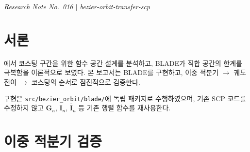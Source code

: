 \documentclass[11pt]{article}
\begin{document}
\drawborder
\thispagestyle{firstpage}


{\normalsize\textit{Research Note No.~016 $|$ bezier-orbit-transfer-scp}}\par\medskip

\def\lighterdate{March 30, 2026}


\begin{abstract}
\cite{report015}에서 이론적으로 분석한 BLADE(Bernstein Local Adaptive Degree Elements)
프레임워크를 구현하고 세 단계로 수치 검증한다.
(1)~이중 적분기에서 해석해 재현, 특수 경우 일치, 상자 제약 비교를 확인한다.
(2)~비선형 궤도 동역학과 J2 세차 시변 경계조건을 포함하는 BLADE-SCP로
공면/비공면 4개 시나리오에서 수렴을 달성한다.
(3)~$\ell_1$ 정규화에 의한 코스팅 자동 결정을
이중 적분기와 궤도전이 양쪽에서 검증하여,
궤도전이에서 12개 세그먼트 중 10개가 자동으로 코스팅 전환되는 것을 확인한다.
\end{abstract}

\section{서론}

\cite{report015}에서 코스팅 구간을 위한 함수 공간 설계를 분석하고,
BLADE가 직합 공간의 한계를 극복함을 이론적으로 보였다.
본 보고서는 BLADE를 구현하고, 이중 적분기 $\to$ 궤도전이 $\to$ 코스팅의
순서로 점진적으로 검증한다.

구현은 \texttt{src/bezier\_orbit/blade/}에 독립 패키지로 수행하였으며,
기존 SCP 코드를 수정하지 않고
$\mathbf{G}_n$, $\mathbf{I}_n$, $\bar{\mathbf{I}}_n$ 등 기존 행렬 함수를 재사용한다.


\section{이중 적분기 검증}
\label{sec:double_int}
\end{document}
